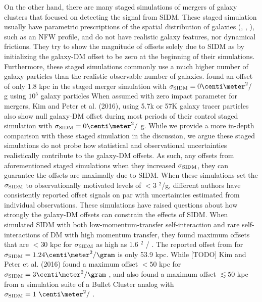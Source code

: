 On the other hand, there are many staged simulations of mergers of galaxy
clusters that focused on detecting the signal from
SIDM. These staged simulation usually have parametric prescriptions of the 
spatial distribution of galaxies  
(\citealt{Randall2008d}, \citealt{Kahlhoefer14}, \citealt{Robertson2016}), 
such as an NFW profile, 
and do not have realistic galaxy features, nor dynamical
frictions. 
They try to show the magnitude of offsets solely due to SIDM \citep{Kahlhoefer14} as 
by initializing the galaxy-DM offset to be zero at the beginning of their 
simulations. 
Furthermore, these staged simulations commonly use a much higher number of 
galaxy particles than the realistic observable number of galaxies. 
\cite{Randall2008d} found an offset of only 1.8 kpc in the staged merger
simulation with $\sigma_{\rm SIDM} = 0 \centi\meter^2 /$ g using $10^5$ 
galaxy particles 
When assumed with zero impact parameter for mergers, Kim and Peter et al.
(2016), using 5.7k or 57K galaxy tracer particles also show 
null galaxy-DM offset during most periods of their control staged simulation 
with $\sigma_{\rm
SIDM} = 0 \centi\meter^2 /$ g. While we provide a more in-depth comparison with
these staged simulation in the discussion, we argue 
these staged simulations do not probe  
how statistical and observational uncertainties realistically contribute to 
the galaxy-DM offsets. 
As such, any offsets 
from aforementioned staged simulations when they increased $\sigma_{\rm
SIDM}$, they can guarantee the offsets are maximally due to SIDM.
When these simulations set the $\sigma_{\rm SIDM}$ to observationally motivated 
levels of $< 3$ \centi\meter$^2$/g, 
different authors have consistently reported offset signals  
on par with uncertainties estimated from individual observations. 
These simulations have raised questions about how strongly the galaxy-DM offsets 
can constrain the effects of SIDM.
When \cite{Kahlhoefer14} simulated SIDM with both low-momentum-transfer 
self-interaction 
and rare self-interactions of DM with high momentum transfer, they found maximum 
offsets that are $< 30$ kpc for $\sigma_{\rm SIDM}$ as high as 1.6
\centi\meter$^2$ / \gram.
The reported offset from \cite{Randall2008d}
for $\sigma_{\rm SIDM} = 1.24 \centi\meter^2 / \gram$ is only 53.9 kpc. 
While [TODO] Kim and Peter et al. (2016) found a maximum offset $< 50$ kpc for 
$\sigma_{\rm SIDM} = 3 \centi\meter^2 / \gram$ ,
and \cite{Robertson2016} also found a maximum offset $\lesssim 50$ kpc  
 from a simulation suite of a Bullet Cluster analog 
 with $\sigma_{\rm SIDM} = 1~\centi\meter^2 /$ \gram.

